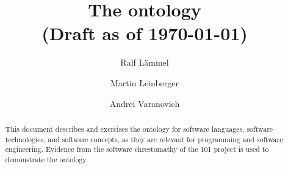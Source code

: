 \documentclass{llncs}
\title{The \solasote{} ontology\\
(Draft as of \today)}
\author{Ralf L\"ammel \and Martin Leinberger \and Andrei Varanovich}
\institute{Fachbereich Informatik, Universit\"at Koblenz-Landau, Germany}
\begin{document}
\maketitle

\begin{abstract}
  This document describes and exercises the \solasote{} ontology for
  software languages, software technologies, and software concepts, as
  they are relevant for programming and software engineering. Evidence
  from the software chrestomathy of the 101 project is used to
  demonstrate the ontology.
\end{abstract}










\end{document}
